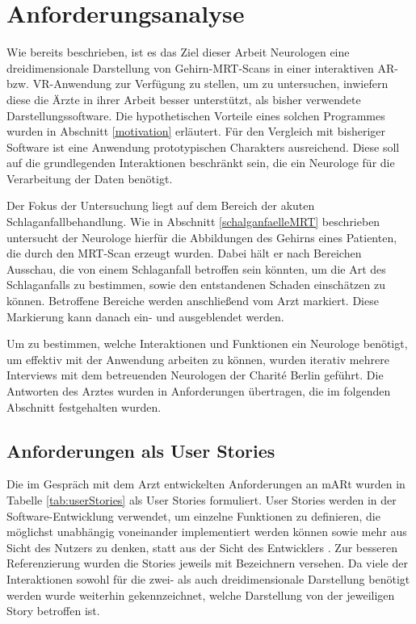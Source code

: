 
\chapter{Anforderungsanalyse}
\label{anforderung}

Wie bereits beschrieben, ist es das Ziel dieser Arbeit Neurologen eine dreidimensionale Darstellung von Gehirn-MRT-Scans in einer interaktiven AR- bzw. VR-Anwendung zur Verfügung zu stellen, um zu untersuchen, inwiefern diese die Ärzte in ihrer Arbeit besser unterstützt, als bisher verwendete Darstellungssoftware. Die hypothetischen Vorteile eines solchen Programmes wurden in Abschnitt \ref{motivation} erläutert.
Für den Vergleich mit bisheriger Software ist eine Anwendung prototypischen Charakters ausreichend. Diese soll auf die grundlegenden Interaktionen beschränkt sein, die ein Neurologe für die Verarbeitung der Daten benötigt.

Der Fokus der Untersuchung liegt auf dem Bereich der akuten Schlaganfallbehandlung. Wie in Abschnitt \ref{schalganfaelleMRT} beschrieben untersucht der Neurologe hierfür die Abbildungen des Gehirns eines Patienten, die durch den MRT-Scan erzeugt wurden. Dabei hält er nach Bereichen Ausschau, die von einem Schlaganfall betroffen sein könnten, um die Art des Schlaganfalls zu bestimmen, sowie den entstandenen Schaden einschätzen zu können. Betroffene Bereiche werden anschließend vom Arzt markiert. Diese Markierung kann danach ein- und ausgeblendet werden.

Um zu bestimmen, welche Interaktionen und Funktionen ein Neurologe benötigt, um effektiv mit der Anwendung arbeiten zu können, wurden iterativ mehrere Interviews mit dem betreuenden Neurologen der Charité Berlin geführt. Die Antworten des Arztes wurden in Anforderungen übertragen, die im folgenden Abschnitt festgehalten wurden. 

\section{Anforderungen als User Stories}

Die im Gespräch mit dem Arzt entwickelten Anforderungen an mARt wurden in Tabelle \ref{tab:userStories} als User Stories formuliert.
User Stories werden in der Software-Entwicklung verwendet, um einzelne Funktionen zu definieren, die möglichst unabhängig voneinander implementiert werden können sowie mehr aus Sicht des Nutzers zu denken, statt aus der Sicht des Entwicklers \cite{UserStoriesApplied}.
Zur besseren Referenzierung wurden die Stories jeweils mit Bezeichnern versehen. Da viele der Interaktionen sowohl für die zwei- als auch dreidimensionale Darstellung benötigt werden wurde weiterhin gekennzeichnet, welche Darstellung von der jeweiligen Story betroffen ist.

